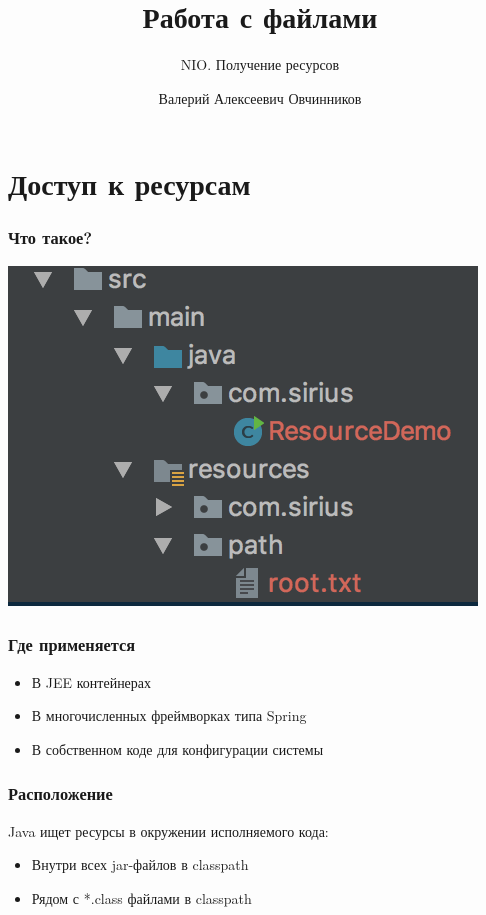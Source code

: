 \documentclass[russian,aspectratio=169,14pt]{beamer}
\title{Работа с файлами}
\subtitle{NIO. Получение ресурсов}
\author{Валерий Алексеевич Овчинников}
\institute{valery.ovchinnikov@phystech.edu}
\begin{document}
\maketitle



\section{Доступ к ресурсам}

\begin{frame}
	\frametitle{Что такое?}
    \begin{center}
	\includegraphics[height=0.75\textheight]{resources.png}
	\end{center}
\end{frame}

\begin{frame}
	\frametitle{Где применяется}
	\begin{itemize}
		\item В JEE контейнерах
		\item В многочисленных фреймворках типа Spring
		\item В собственном коде для конфигурации системы
	\end{itemize}
\end{frame}

\begin{frame}
	\frametitle{Расположение}
	Java ищет ресурсы в окружении исполняемого кода:
	\vfill
	\begin{itemize}
		\item Внутри всех jar-файлов в classpath
		\item Рядом с *.class файлами в classpath
	\end{itemize}
\end{frame}
\end{document}
